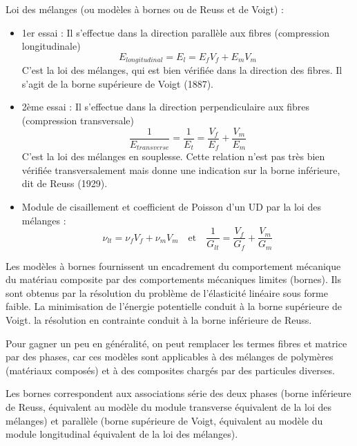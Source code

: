 \medskip
Loi des mélanges (ou modèles à bornes ou de Reuss et de Voigt) :
\begin{itemize}
	\item 1er essai : Il s'effectue dans la direction parallèle aux fibres (compression longitudinale)
		\begin{equation} E_{longitudinal}=E_l=E_fV_f+E_mV_m \end{equation}
		C'est la loi des mélanges, qui est bien vérifiée dans la direction des fibres.
		Il s'agit de la borne supérieure de Voigt (1887).
	\item 2ème essai : Il s'effectue dans la direction perpendiculaire aux fibres (compression transversale)
		\begin{equation}\dfrac1{E_{transverse}}=\dfrac1{E_t} = \dfrac{V_f}{E_f}+\dfrac{V_m}{E_m}\end{equation}
		C'est la loi des mélanges en souplesse.
		Cette relation n'est pas très bien vérifiée transversalement mais donne une
		indication sur la borne inférieure, dit de Reuss (1929).
	\item Module de cisaillement et coefficient de Poisson
		d'un UD par la loi des mélanges :
		\begin{equation}\nu_{lt}=\nu_fV_f+\nu_mV_m\quad\text{et}\quad\dfrac1{G_{lt}} = \dfrac{V_f}{G_f}+\dfrac{V_m}{G_m}\end{equation}
\end{itemize}

\medskip
Les modèles à bornes fournissent un encadrement du comportement mécanique du matériau composite
par des comportements mécaniques limites (bornes).
Ils sont obtenus par la résolution du problème de l'élasticité linéaire sous forme faible.
La minimisation de l'énergie potentielle conduit à la borne supérieure de Voigt.
la résolution en contrainte conduit à la borne inférieure de Reuss.

\medskip
Pour gagner un peu en généralité, on peut remplacer les termes fibres et matrice par des phases,
car ces modèles sont applicables à des mélanges de polymères (matériaux composés)
et à des composites chargés par des particules diverses.

Les bornes correspondent aux associations série des deux phases (borne inférieure de Reuss,
équivalent au modèle  du module transverse équivalent de la loi des mélanges) et parallèle
(borne supérieure de Voigt, équivalent au modèle  du module longitudinal équivalent de la loi des mélanges).

